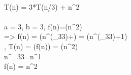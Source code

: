 \\T(n) = 3*T(n/3) + n^{2}\\
\newline
{}\\
a = 3, b = 3, f(n)=\Omega(n^{2})\\
=> f(n) = \Omega(n^{(\log_{3}3)+\epsilon}) = \Omega(n^{(\log_{3}3)+1})\\
\newline
{}, T(n) = \Theta(f(n)) = \Theta(n^{2})\\
\newline
{}n^{\log_{3}3}=n^{1}\\
 f(n) = n^{2}
